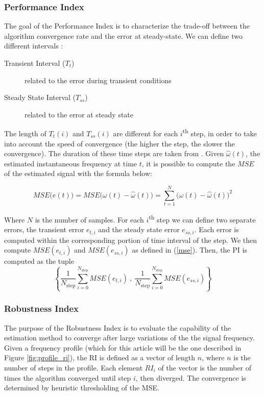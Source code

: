 \documentclass{article}
\begin{document}
\subsubsection{Performance Index}
The goal of the Performance Index is to characterize the
trade-off between the algorithm convergence rate and the error at steady-state. We can define two different intervals :
\begin{description}
    \item[Transient Interval ($T_t$)] related to the error during transient conditions
    \item[Steady State Interval ($T_{ss}$)] related to the error at steady state
\end{description}
The length of $T_t(i)$ and $T_{ss}(i)$ are different for each $i$\textsuperscript{th} step, in order to take into account the speed of convergence (the higher the step, the slower the convergence). The duration of these time steps are taken from \cite[Table~1]{UKF}.
Given $\hat{\omega}(t)$, the estimated instantaneous frequency at time $t$, it is possible to compute the $MSE$ of the estimated signal with the formula below:

\begin{equation}\label{mse}
MSE\big(e(t)\big) = MSE\big(\omega(t) - \hat{\omega}(t) \big) = \sum_{t=1}^{N}\big(\omega(t)- \hat{\omega}(t)\big)^{2}
\end{equation}

Where $N$ is the number of samples. For each $i$\textsuperscript{th} step we can define two separate errors, the transient error $e_{t,i}$ and the steady state error $e_{ss,i}$. Each error is computed within the corresponding portion of time interval of the step. We then compute $MSE(e_{t,i})$ and $MSE(e_{ss,i})$ as defined in (\ref{mse}). Then, the PI is computed as the tuple 
$$\left\{
\frac{1}{N_{\text{step}}}
\sum_{i=0}^{N_{\text{step}}}
{MSE(e_{t,i})} \ , \ 
\frac{1}{N_{\text{step}}}
\sum_{i=0}^{N_{\text{step}}}
{MSE(e_{ss,i})} 
\right\}$$ 

\subsubsection{Robustness Index}
The purpose of the Robustness Index is to evaluate the capability of the estimation method to converge after large variations of the the signal frequency. Given a frequency profile (which for this article will be the one described in Figure \ref{fig:profile_ri}), the RI is defined as a vector of length $n$, where $n$ is the number of steps in the profile. Each element $RI_i$ of the vector is the number of times the algorithm converged until step $i$, then diverged. The convergence is determined by heuristic thresholding of the MSE.
\end{document}
